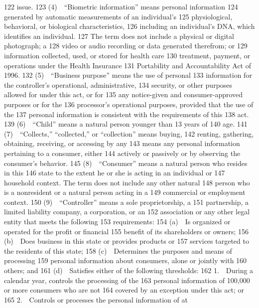   122  issue.
  123         (4) “Biometric information” means personal information
  124  generated by automatic measurements of an individual’s
  125  physiological, behavioral, or biological characteristics,
  126  including an individual’s DNA, which identifies an individual.
  127  The term does not include a physical or digital photograph; a
  128  video or audio recording or data generated therefrom; or
  129  information collected, used, or stored for health care
  130  treatment, payment, or operations under the Health Insurance
  131  Portability and Accountability Act of 1996.
  132         (5) “Business purpose” means the use of personal
  133  information for the controller’s operational, administrative,
  134  security, or other purposes allowed for under this act, or for
  135  any notice-given and consumer-approved purposes or for the
  136  processor’s operational purposes, provided that the use of the
  137  personal information is consistent with the requirements of this
  138  act.
  139         (6) “Child” means a natural person younger than 13 years of
  140  age.
  141         (7) “Collects,” “collected,” or “collection” means buying,
  142  renting, gathering, obtaining, receiving, or accessing by any
  143  means any personal information pertaining to a consumer, either
  144  actively or passively or by observing the consumer’s behavior.
  145         (8) “Consumer” means a natural person who resides in this
  146  state to the extent he or she is acting in an individual or
  147  household context. The term does not include any other natural
  148  person who is a nonresident or a natural person acting in a
  149  commercial or employment context.
  150         (9) “Controller” means a sole proprietorship, a
  151  partnership, a limited liability company, a corporation, or an
  152  association or any other legal entity that meets the following
  153  requirements:
  154         (a) Is organized or operated for the profit or financial
  155  benefit of its shareholders or owners;
  156         (b) Does business in this state or provides products or
  157  services targeted to the residents of this state;
  158         (c) Determines the purposes and means of processing
  159  personal information about consumers, alone or jointly with
  160  others; and
  161         (d) Satisfies either of the following thresholds:
  162         1. During a calendar year, controls the processing of the
  163  personal information of 100,000 or more consumers who are not
  164  covered by an exception under this act; or
  165         2. Controls or processes the personal information of at
